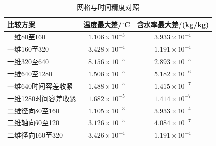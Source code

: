 \begin{table}[H]\centering\small
\caption{网格与时间精度对照}\label{tab:q2_convergence}
\begin{tabular}{lcc}
\toprule
比较方案 & 温度最大差/$^\circ$C & 含水率最大差/(kg/kg)\\\midrule
一维80至160 & $1.106\times10^{-3}$ & $3.933\times10^{-4}$\\
一维160至320 & $3.428\times10^{-4}$ & $1.191\times10^{-4}$\\
一维320至640 & $8.156\times10^{-5}$ & $2.893\times10^{-5}$\\
一维640至1280 & $1.506\times10^{-5}$ & $5.182\times10^{-6}$\\
一维640时间容差收紧 & $1.488\times10^{-5}$ & $1.415\times10^{-7}$\\
一维1280时间容差收紧 & $1.682\times10^{-5}$ & $1.414\times10^{-7}$\\
二维径向80至160 & $1.105\times10^{-3}$ & $3.933\times10^{-4}$\\
二维轴向60至120 & $3.126\times10^{-5}$ & $4.084\times10^{-7}$\\
二维径向160至320 & $3.426\times10^{-4}$ & $1.191\times10^{-4}$\\
\bottomrule\end{tabular}\end{table}
